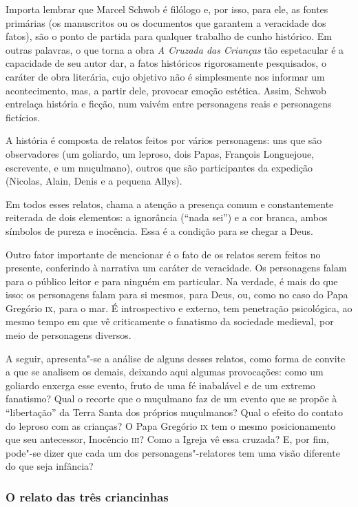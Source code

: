 \documentclass[12pt]{extarticle}
\begin{document}
Importa lembrar que Marcel Schwob é filólogo e, por isso, para ele, as
fontes primárias (os manuscritos ou os documentos que garantem a
veracidade dos fatos), são o ponto de partida para qualquer trabalho de
cunho histórico. Em outras palavras, o que torna a obra \textit{A Cruzada das
Crianças} tão espetacular é a capacidade de seu autor dar, a fatos
históricos rigorosamente pesquisados, o caráter de obra literária, cujo
objetivo não é simplesmente nos informar um acontecimento, mas, a partir
dele, provocar emoção estética. Assim, Schwob entrelaça história e
ficção, num vaivém entre personagens reais e personagens fictícios.

A história é composta de relatos feitos por vários personagens: uns que
são observadores (um goliardo, um leproso, dois Papas, François
Longuejoue, escrevente, e um muçulmano), outros que são participantes da
expedição (Nicolas, Alain, Denis e a pequena Allys).

Em todos esses relatos, chama a atenção a presença comum e
constantemente reiterada de dois elementos: a ignorância (``nada sei'')
e a cor branca, ambos símbolos de pureza e inocência. Essa é a condição
para se chegar a Deus.

Outro fator importante de mencionar é o fato de os relatos serem feitos
no presente, conferindo à narrativa um caráter de veracidade. Os
personagens falam para o público leitor e para ninguém em particular. Na
verdade, é mais do que isso: os personagens falam para si mesmos, para
Deus, ou, como no caso do Papa Gregório \textsc{ix}, para o mar. É introspectivo
e externo, tem penetração psicológica, ao mesmo tempo em que vê
criticamente o fanatismo da sociedade medieval, por meio de personagens
diversos.

A seguir, apresenta"-se a análise de alguns desses relatos, como forma de
convite a que se analisem os demais, deixando aqui algumas provocações:
como um goliardo enxerga esse evento, fruto de uma fé inabalável e de um
extremo fanatismo? Qual o recorte que o muçulmano faz de um evento que
se propõe à ``libertação'' da Terra Santa dos próprios muçulmanos? Qual
o efeito do contato do leproso com as crianças? O Papa Gregório \textsc{ix} tem o
mesmo posicionamento que seu antecessor, Inocêncio \textsc{iii}? Como a Igreja vê
essa cruzada? E, por fim, pode"-se dizer que cada um dos
personagens"-relatores tem uma visão diferente do que seja infância?

\subsubsection{O relato das três criancinhas}
\end{document}
